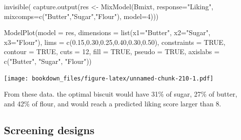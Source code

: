 \documentclass[
]{krantz}
\makeatletter
\newenvironment{Shaded}{\begin{snugshade}}{\end{snugshade}}
\newcommand{\AttributeTok}[1]{\textcolor[rgb]{0.61,0.61,0.61}{#1}}
\newcommand{\ConstantTok}[1]{\textcolor[rgb]{0,0,0}{#1}}
\newcommand{\DecValTok}[1]{\textcolor[rgb]{0.06,0.06,0.06}{#1}}
\newcommand{\FloatTok}[1]{\textcolor[rgb]{0.06,0.06,0.06}{#1}}
\newcommand{\FunctionTok}[1]{\textcolor[rgb]{0,0,0}{#1}}
\newcommand{\NormalTok}[1]{#1}
\newcommand{\OtherTok}[1]{\textcolor[rgb]{0.37,0.37,0.37}{#1}}
\newcommand{\StringTok}[1]{\textcolor[rgb]{0.5,0.5,0.5}{#1}}
\newenvironment{kframe}{%
\medskip{}
\setlength{\fboxsep}{.8em}
 \def\at@end@of@kframe{}%
 \ifinner\ifhmode%
  \def\at@end@of@kframe{\end{minipage}}%
  \begin{minipage}{\columnwidth}%
 \fi\fi%
 \def\FrameCommand##1{\hskip\@totalleftmargin \hskip-\fboxsep
 \colorbox{shadecolor}{##1}\hskip-\fboxsep
     \hskip-\linewidth \hskip-\@totalleftmargin \hskip\columnwidth}%
 \MakeFramed {\advance\hsize-\width
   \@totalleftmargin\z@ \linewidth\hsize
   \@setminipage}}%
 {\par\unskip\endMakeFramed%
 \at@end@of@kframe}
\renewenvironment{Shaded}{\begin{kframe}}{\end{kframe}}
\makeatother
\begin{document}
\begin{Shaded}
\begin{Highlighting}[]
\FunctionTok{invisible}\NormalTok{(}
  \FunctionTok{capture.output}\NormalTok{(res }\OtherTok{\textless{}{-}} \FunctionTok{MixModel}\NormalTok{(Bmixt, }\AttributeTok{response=}\StringTok{"Liking"}\NormalTok{, }
                                 \AttributeTok{mixcomps=}\FunctionTok{c}\NormalTok{(}\StringTok{"Butter"}\NormalTok{,}\StringTok{"Sugar"}\NormalTok{,}\StringTok{"Flour"}\NormalTok{), }
                                 \AttributeTok{model=}\DecValTok{4}\NormalTok{)))}

\FunctionTok{ModelPlot}\NormalTok{(}\AttributeTok{model =}\NormalTok{ res,}
          \AttributeTok{dimensions =} \FunctionTok{list}\NormalTok{(}\AttributeTok{x1=}\StringTok{"Butter"}\NormalTok{, }\AttributeTok{x2=}\StringTok{"Sugar"}\NormalTok{, }\AttributeTok{x3=}\StringTok{"Flour"}\NormalTok{),}
          \AttributeTok{lims =} \FunctionTok{c}\NormalTok{(}\FloatTok{0.15}\NormalTok{,}\FloatTok{0.30}\NormalTok{,}\FloatTok{0.25}\NormalTok{,}\FloatTok{0.40}\NormalTok{,}\FloatTok{0.30}\NormalTok{,}\FloatTok{0.50}\NormalTok{), }\AttributeTok{constraints =} \ConstantTok{TRUE}\NormalTok{,}
          \AttributeTok{contour =} \ConstantTok{TRUE}\NormalTok{, }\AttributeTok{cuts =} \DecValTok{12}\NormalTok{, }\AttributeTok{fill =} \ConstantTok{TRUE}\NormalTok{, }\AttributeTok{pseudo =} \ConstantTok{TRUE}\NormalTok{,}
          \AttributeTok{axislabs =} \FunctionTok{c}\NormalTok{(}\StringTok{"Butter"}\NormalTok{, }\StringTok{"Sugar"}\NormalTok{, }\StringTok{"Flour"}\NormalTok{))}
\end{Highlighting}
\end{Shaded}

\texttt{[image: bookdown\_files/figure-latex/unnamed-chunk-210-1.pdf]}

From these data. the optimal biscuit would have 31\% of sugar, 27\% of butter, and 42\% of flour, and would reach a predicted liking score larger than 8.

\hypertarget{screening-designs}{%
\subsection{Screening designs}\label{screening-designs}}
\end{document}
